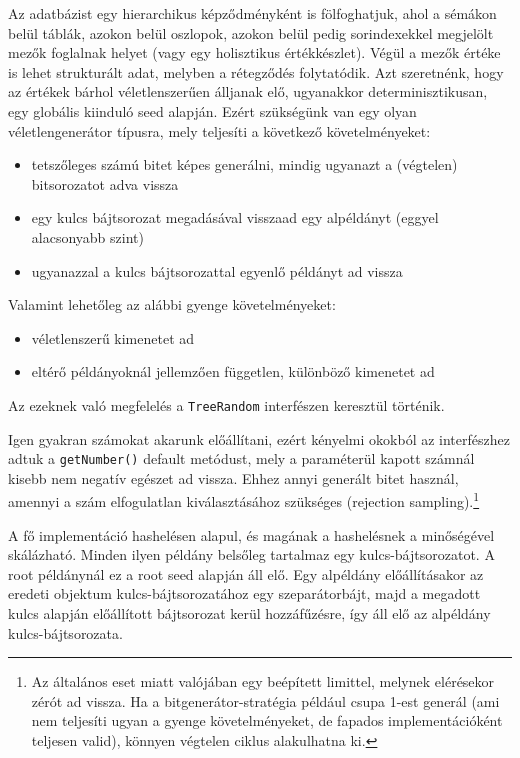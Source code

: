 \documentclass[
    parspace,
    noindent,
    nohyp,
]{elteiktdk}[2023/04/10]
\begin{document}
Az adatbázist egy hierarchikus képződményként is fölfoghatjuk,
ahol a sémákon belül táblák, azokon belül oszlopok,
azokon belül pedig sorindexekkel megjelölt mezők foglalnak helyet
(vagy egy holisztikus értékkészlet).
Végül a mezők értéke is lehet strukturált adat, melyben a rétegződés folytatódik.
Azt szeretnénk, hogy az értékek bárhol véletlenszerűen álljanak elő,
ugyanakkor determinisztikusan, egy globális kiinduló seed alapján.
Ezért szükségünk van egy olyan véletlengenerátor típusra,
mely teljesíti a következő követelményeket:

\begin{itemize}
    \item tetszőleges számú bitet képes generálni, mindig ugyanazt a (végtelen) bitsorozatot adva vissza
   \item egy kulcs bájtsorozat megadásával visszaad egy alpéldányt (eggyel alacsonyabb szint)
   \item ugyanazzal a kulcs bájtsorozattal egyenlő példányt ad vissza
\end{itemize}

Valamint lehetőleg az alábbi gyenge követelményeket:

\begin{itemize}
   \item véletlenszerű kimenetet ad
   \item eltérő példányoknál jellemzően független, különböző kimenetet ad
\end{itemize}

Az ezeknek való megfelelés a \texttt{TreeRandom} interfészen keresztül történik.

Igen gyakran számokat akarunk előállítani,
ezért kényelmi okokból az interfészhez adtuk a \texttt{getNumber()} default metódust,
mely a paraméterül kapott számnál kisebb nem negatív egészet ad vissza.
Ehhez annyi generált bitet használ,
amennyi a szám elfogulatlan kiválasztásához szükséges (rejection sampling).\footnote{
  Az általános eset miatt valójában egy beépített limittel, melynek elérésekor zérót ad vissza.
  Ha a bitgenerátor-stratégia például csupa 1-est generál
  (ami nem teljesíti ugyan a gyenge követelményeket, de fapados implementációként teljesen valid),
  könnyen végtelen ciklus alakulhatna ki.
}

A fő implementáció hashelésen alapul, és magának a hashelésnek a minőségével skálázható.
Minden ilyen példány belsőleg tartalmaz egy kulcs-bájtsorozatot.
A root példánynál ez a root seed alapján áll elő.
Egy alpéldány előállításakor az eredeti objektum kulcs-bájtsorozatához egy szeparátorbájt,
majd a megadott kulcs alapján előállított bájtsorozat kerül hozzáfűzésre,
így áll elő az alpéldány kulcs-bájtsorozata.
\end{document}
